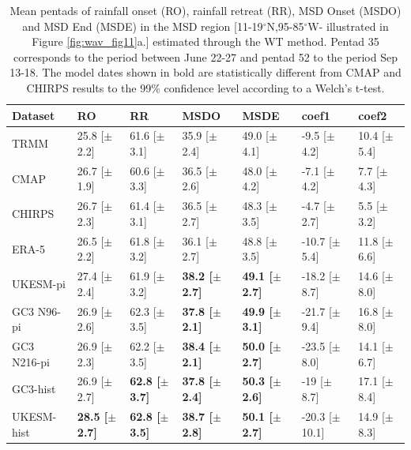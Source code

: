 \begin{table}
\caption{Mean pentads of rainfall onset (RO), rainfall retreat (RR), MSD Onset (MSDO) and MSD End (MSDE) in the MSD region [11-19$^\circ$N,95-85$^\circ$W- illustrated in Figure \ref{fig:wav_fig11}a.] estimated through the WT method. Pentad 35 corresponds to the period between June 22-27 and pentad 52 to the period Sep 13-18. The model dates shown in bold are statistically different from CMAP and CHIRPS results to the 99\% confidence level according to a Welch's t-test. }
\label{tab:4}       %
\begin{tabular}{p{2cm}p{1.5cm}p{1.5cm}p{1.5cm}p{1.5cm}p{1.75cm}p{1.75cm}}
\hline\noalign{\smallskip}
Dataset & RO & RR & MSDO & MSDE & coef1 & coef2  \\ \hline
TRMM & 25.8 [$\pm$2.2] & 61.6 [$\pm$3.1] & 35.9 [$\pm$2.4] & 49.0 [$\pm$4.1] & -9.5 [$\pm$4.2] & 10.4 [$\pm$5.4]  \\
CMAP & 26.7 [$\pm$1.9] & 60.6 [$\pm$3.3] & 36.5 [$\pm$2.6] & 48.0 [$\pm$4.2] & -7.1 [$\pm$4.2] & 7.7 [$\pm$4.3]  \\
CHIRPS & 26.7 [$\pm$2.3] & 61.4 [$\pm$3.1] & 36.5 [$\pm$2.7] & 48.3 [$\pm$3.5] & -4.7 [$\pm$2.7] & 5.5 [$\pm$3.2]  \\
ERA-5 & 26.5 [$\pm$2.2] & 61.8 [$\pm$3.2] & 36.1 [$\pm$2.7] & 48.8 [$\pm$3.5] & -10.7 [$\pm$5.4] & 11.8 [$\pm$6.6]  \\
UKESM-pi & 27.4 [$\pm$2.4] & 61.9 [$\pm$3.2] & \bf{38.2} [$\pm$2.7] & \bf{49.1} [$\pm$2.7] & -18.2 [$\pm$8.7] & 14.6 [$\pm$8.0]  \\
GC3 N96-pi  & 26.9 [$\pm$2.6] & 62.3 [$\pm$3.5] & \bf{37.8} [$\pm$2.1] & \bf{49.9} [$\pm$3.1] & -21.7 [$\pm$9.4] & 16.8 [$\pm$8.0]  \\
GC3 N216-pi  & 26.9 [$\pm$2.3] & 62.2 [$\pm$3.5] & \bf{38.4} [$\pm$2.1] & \bf{50.0} [$\pm$2.7] & -23.5 [$\pm$8.0] & 14.1 [$\pm$6.7]  \\
GC3-hist & 26.9 [$\pm$2.7] & \bf{62.8} [$\pm$3.7] & \bf{37.8} [$\pm$2.4] & \bf{50.3} [$\pm$2.6] & -19 [$\pm$8.7] & 17.1 [$\pm$8.4] \\
UKESM-hist & \bf{28.5} [$\pm$2.7] & \bf{62.8} [$\pm$3.5] & \bf{38.7} [$\pm$2.8] & \bf{50.1} [$\pm$2.7] & -20.3 [$\pm$10.1] & 14.9 [$\pm$8.3]  \\
\end{tabular}
\end{table}

